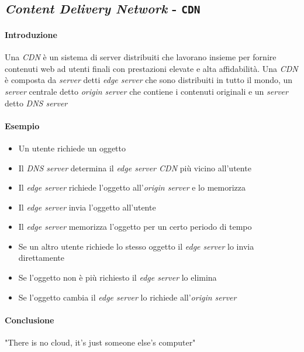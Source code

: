     \subsection{\textit{Content Delivery Network} - \texttt{CDN}}
        \paragraph{Introduzione} Una \textit{CDN} è un sistema di server distribuiti che lavorano insieme per fornire contenuti web ad utenti finali con prestazioni elevate e alta affidabilità. Una \textit{CDN} è composta da \textit{server} detti \textit{edge server} che sono distribuiti in tutto il mondo, un \textit{server} centrale detto \textit{origin server} che contiene i contenuti originali e un \textit{server} detto \textit{DNS server}
        \paragraph{Esempio} 
            \begin{itemize}
                \item Un utente richiede un oggetto
                \item Il \textit{DNS server} determina il \textit{edge server CDN} più vicino all'utente
                \item Il \textit{edge server} richiede l'oggetto all'\textit{origin server} e lo memorizza
                \item Il \textit{edge server} invia l'oggetto all'utente
                \item Il \textit{edge server} memorizza l'oggetto per un certo periodo di tempo
                \item Se un altro utente richiede lo stesso oggetto il \textit{edge server} lo invia direttamente
                \item Se l'oggetto non è più richiesto il \textit{edge server} lo elimina
                \item Se l'oggetto cambia il \textit{edge server} lo richiede all'\textit{origin server}
            \end{itemize}
    
    \paragraph{Conclusione} "There is no cloud, it's just someone else's computer"